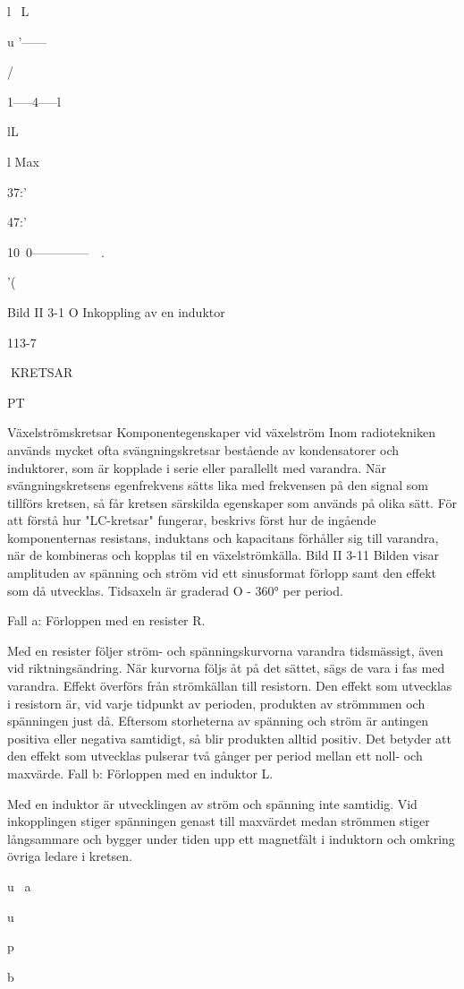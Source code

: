 l~
L

u
'------{ /

1-----4-----l

lL

l Max

37:'

47:'

10~0--------------~~.

'(

Bild II 3-1 O Inkoppling av en induktor

113-7

KRETSAR

PT

Växelströmskretsar
Komponentegenskaper vid växelström
Inom radiotekniken används mycket ofta
svängningskretsar bestående av kondensatorer och induktorer, som är kopplade i serie
eller parallellt med varandra. När svängningskretsens egenfrekvens sätts lika med
frekvensen på den signal som tillförs kretsen, så får kretsen särskilda egenskaper
som används på olika sätt.
För att förstå hur "LC-kretsar" fungerar,
beskrivs först hur de ingående komponenternas resistans, induktans och kapacitans
förhåller sig till varandra, när de kombineras
och kopplas til en växelströmkälla.
Bild II 3-11
Bilden visar amplituden av spänning och
ström vid ett sinusformat förlopp samt den
effekt som då utvecklas. Tidsaxeln är graderad O - 360° per period.

Fall a: Förloppen med en resister R.

Med en resister följer ström- och spänningskurvorna varandra tidsmässigt, även
vid riktningsändring. När kurvorna följs åt på
det sättet, sägs de vara i fas med varandra.
Effekt överförs från strömkällan till resistorn. Den effekt som utvecklas i resistorn är,
vid varje tidpunkt av perioden, produkten av
strömmmen och spänningen just då. Eftersom storheterna av spänning och ström är
antingen positiva eller negativa samtidigt, så
blir produkten alltid positiv. Det betyder att
den effekt som utvecklas pulserar två gånger per period mellan ett noll- och maxvärde.
Fall b: Förloppen med en induktor L.

Med en induktor är utvecklingen av ström
och spänning inte samtidig. Vid inkopplingen stiger spänningen genast till maxvärdet
medan strömmen stiger långsammare och
bygger under tiden upp ett magnetfält i induktorn och omkring övriga ledare i kretsen.

u~
a

u~

p

b

}
